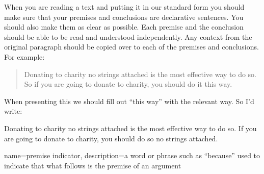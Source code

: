When you are reading a text and putting it in our standard form you should make sure that your premises and conclusions are declarative sentences. 
You should also make them as clear as possible. Each premise and the conclusion should be able to be read and understood independently. Any context from the original paragraph should be copied over to each of the premises and conclusions. 
For example:
\begin{quote}
Donating to charity no strings attached is the most effective way to do so. So if you are going to donate to charity, you should do it this way.
\end{quote}
When presenting this we should fill out ``this way'' with the relevant way. So I'd write:
\begin{earg}
\prem	Donating to charity no strings attached is the most effective way to do so.
\conc  If you are going to donate to charity, you should do so no strings attached.
\end{earg}







%





{
name=premise indicator,
description={a word or phrase such as ``because'' used to indicate that what follows is the premise of an argument}
}

